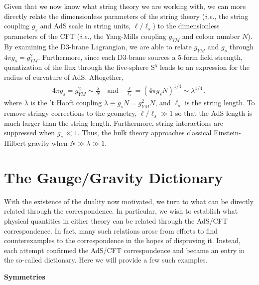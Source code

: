\documentclass[../PhD.tex]{subfiles}
\begin{document}
Given that we now know what string theory we are working with, we can more directly relate the dimensionless parameters of the string theory ({\it i.e.}, the string coupling $g_s$ and AdS scale in string units, $\ell / \ell_s$) to the dimensionless parameters of the CFT ({\it i.e.}, the Yang-Mills coupling $g_{YM}$ and colour number $N$). By examining the D3-brane Lagrangian, we are able to relate $g_{YM}$ and $g_s$ through $4\pi g_s = g_{YM}^2$. Furthermore, since each D3-brane sources a 5-form field strength, quantization of the flux through the five-sphere S$^5$ leads to an expression for the radius of curvature of AdS. Altogether,
\begin{align}
\label{params}
4\pi g_s = g_{YM}^2 \sim \frac{\lambda}{N} \quad \text{and} \quad \frac{\ell}{\ell_s} = \left( 4\pi g_s N \right)^{1/4} \sim \lambda^{1/4} \, ,
\end{align}
where $\lambda$ is the 't Hooft coupling $\lambda \equiv g_s N = g_{YM}^2 N$, and $\ell_s$ is the string length. To remove stringy corrections to the geometry, $\ell / \ell_s \gg 1$ so that the AdS length is much larger than the string length. Furthermore, string interactions are suppressed when $g_s \ll 1$. Thus, the bulk theory approaches  classical Einstein-Hilbert gravity when $N \gg \lambda \gg 1$.


\section{The Gauge/Gravity Dictionary}
\label{ssec: dictionary}

With the existence of the duality now motivated, we turn to what can be directly related through the correspondence. In particular, we wish to establish what physical quantities in either theory can be related through the AdS/CFT correspondence. In fact, many such relations arose from efforts to find counterexamples to the correspondence in the hopes of disproving it. Instead, each attempt confirmed the AdS/CFT correspondence and became an entry in the so-called dictionary. Here we will provide a few such examples.

{\bf Symmetries}
\end{document}
